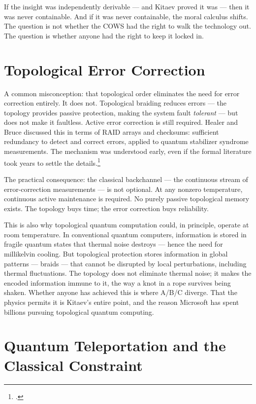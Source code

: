 If the insight was independently derivable --- and Kitaev proved it was --- then it was never containable. And if it was never containable, the moral calculus shifts. The question is not whether the COWS had the right to walk the technology out. The question is whether anyone had the right to keep it locked in.

\section*{Topological Error Correction}
\label{spine:braid-topological-error-correction}

A common misconception: that topological order eliminates the need for error correction entirely. It does not. Topological braiding reduces errors --- the topology provides passive protection, making the system fault \textit{tolerant} --- but does not make it faultless. Active error correction is still required. Healer and Bruce discussed this in terms of RAID arrays and checksums: sufficient redundancy to detect and correct errors, applied to quantum stabilizer syndrome measurements. The mechanism was understood early, even if the formal literature took years to settle the details.\footcite{nayak2008}

The practical consequence: the classical backchannel --- the continuous stream of error-correction measurements --- is not optional. At any nonzero temperature, continuous active maintenance is required. No purely passive topological memory exists. The topology buys time; the error correction buys reliability.

This is also why topological quantum computation could, in principle, operate at room temperature. In conventional quantum computers, information is stored in fragile quantum states that thermal noise destroys --- hence the need for millikelvin cooling. But topological protection stores information in global patterns --- braids --- that cannot be disrupted by local perturbations, including thermal fluctuations. The topology does not eliminate thermal noise; it makes the encoded information immune to it, the way a knot in a rope survives being shaken. Whether anyone has achieved this is where A/B/C diverge. That the physics permits it is Kitaev's entire point, and the reason Microsoft has spent billions pursuing topological quantum computing.

\section*{Quantum Teleportation and the Classical Constraint}
\label{spine:braid-quantum-teleportation-and-the-classical-constraint}

